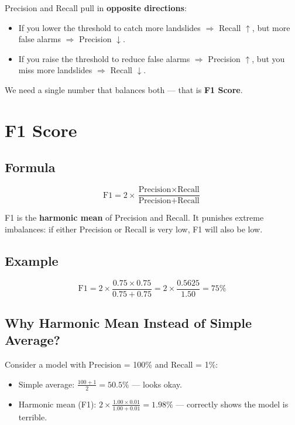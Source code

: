 \documentclass[11pt]{article}
\begin{document}
Precision and Recall pull in \textbf{opposite directions}:
\begin{itemize}[noitemsep]
    \item If you lower the threshold to catch more landslides $\Rightarrow$ Recall $\uparrow$, but more false alarms $\Rightarrow$ Precision $\downarrow$.
    \item If you raise the threshold to reduce false alarms $\Rightarrow$ Precision $\uparrow$, but you miss more landslides $\Rightarrow$ Recall $\downarrow$.
\end{itemize}

\noindent We need a single number that balances both --- that is \textbf{F1 Score}.

\section{F1 Score}

\subsection{Formula}
\[
\text{F1} = 2 \times \frac{\text{Precision} \times \text{Recall}}{\text{Precision} + \text{Recall}}
\]

\noindent F1 is the \textbf{harmonic mean} of Precision and Recall.
It punishes extreme imbalances: if either Precision or Recall is very low, F1 will also be low.

\subsection{Example}
\[
\text{F1} = 2 \times \frac{0.75 \times 0.75}{0.75 + 0.75} = 2 \times \frac{0.5625}{1.50} = \boxed{75\%}
\]

\subsection{Why Harmonic Mean Instead of Simple Average?}

Consider a model with Precision = 100\% and Recall = 1\%:
\begin{itemize}[noitemsep]
    \item Simple average: $\frac{100 + 1}{2} = 50.5\%$ --- looks okay.
    \item Harmonic mean (F1): $2 \times \frac{1.00 \times 0.01}{1.00 + 0.01} = 1.98\%$ --- correctly shows the model is terrible.
\end{itemize}
\end{document}
